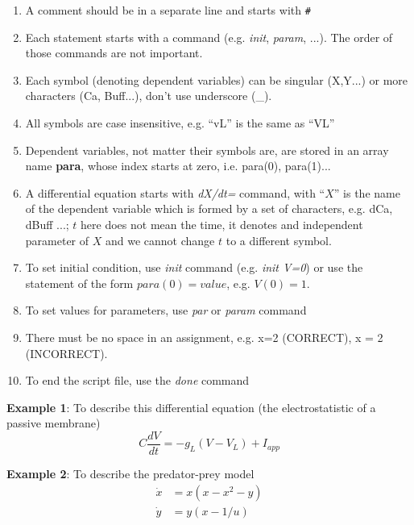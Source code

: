 \begin{enumerate}
\item A comment should be in a separate line and starts with
\verb!#!

\item Each statement starts with a command (e.g. {\it init}, {\it param},
...). The order of those commands are not important.

\item Each symbol (denoting dependent variables) can be singular
(X,Y...) or more characters (Ca, Buff...), don't use underscore (\_).

\item All symbols are case insensitive, e.g. ``vL'' is the same
as ``VL''

\item Dependent variables, not matter their symbols are, are
stored in an array name {\bf para}, whose index starts at zero,
i.e. para(0), para(1)...

\item A differential equation starts with {\it dX/dt=} command,
with ``$X$'' is the name of the dependent variable which is formed by
a set of characters, e.g. dCa, dBuff ...; $t$ here does not mean the
time, it denotes and independent parameter of $X$ and we cannot change
$t$ to a different symbol.

\item To set initial condition, use {\it init} command
  (e.g. {\it init V=0}) or use the statement of the form $para(0)=value$,
  e.g. $V(0)=1$.

\item To set values for parameters, use {\it par} or {\it param}
command

\item There must be no space in an assignment, e.g. x=2
(CORRECT), x = 2 (INCORRECT).


\item To end the script file, use the {\it done} command

\end{enumerate}

{\bf Example 1}: To describe this differential equation (the
electrostatistic of a passive membrane)
\begin{equation}
  \label{eq:122}
  C\frac{dV}{dt} = -g_L(V-V_L) + I_{app}
\end{equation}



{\bf Example 2}: To describe the predator-prey model
\begin{equation}
  \label{eq:259}
  \begin{split}
    \dot{x} &= x(x-x^2-y) \\
    \dot{y} &= y(x-1/u)
  \end{split}
\end{equation}


